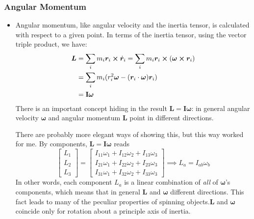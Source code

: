 \documentclass[11pt, a4paper]{article}
\newcommand{\bdot}[1]{\dot{\bm{#1}}} %
\newcommand{\mat}[1]{\mathbf{#1}} %
\begin{document}
\subsubsection{Angular Momentum}
\begin{itemize}
	\item Angular momentum, like angular velocity and the inertia tensor, is calculated with respect to a given point. In terms of the inertia tensor, using the vector triple product, we have:
	\begin{align*}
		\bm{L} &= \sum_{i} m_{i} \bm{r}_{i} \cross \bdot{r}_{i} = \sum_{i} m_{i} \bm{r}_{i} \cross (\bm{\omega} \cross \bm{r}_{i}) \\
		&= \sum_{i} m_i (r_{i}^2 \bm{\omega} - (\bm{r}_{i} \cdot  \bm{\omega})\bm{r}_{i} )\\
		& = \mathbf{I} \bm{\omega}
	\end{align*}
	There is an important concept hiding in the result $ \bm{L} = \mat{I} \bm{\omega} $: in general angular velocity $ \bm{\omega} $ and angular momentum $ \bm{L} $ point in different directions. 
	
	There are probably more elegant ways of showing this, but this way worked for me. By components, $  \bm{L} = \mat{I} \bm{\omega} $ reads
	\begin{equation*}
		\begin{bmatrix}
			L_{1}\\
			L_{2}\\
			L_{3}
		\end{bmatrix}
		= 
		\begin{bmatrix}
			I_{11} \omega_{1} + I_{12}\omega_{2} + I_{13}\omega_{3}\\
			I_{21} \omega_{1} + I_{22}\omega_{2} + I_{23}\omega_{3}\\
			I_{31} \omega_{1} + I_{32}\omega_{2} + I_{33}\omega_{3}
		\end{bmatrix} 
		\implies L_{a} = I_{ab} \omega_{b}
	\end{equation*}
	In other words, each component $ L_{a} $ is a linear combination of \textit{all} of $ \bm{\omega} $'s components, which means that in general $ \bm{L} $ and $ \bm{\omega} $  different directions.  This fact leads to many of the peculiar properties of spinning objects.$ \bm{L} $ and $ \bm{\omega} $ coincide only for rotation about a principle axis of inertia.
	

	
\end{itemize}
\end{document}
